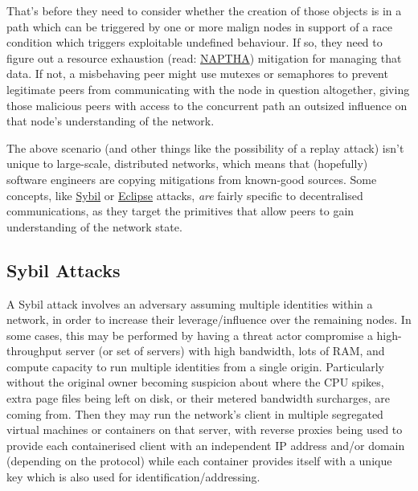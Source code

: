 That's before they need to consider whether the creation of those objects is in a path which can be triggered by one or more malign nodes in support of a race condition which triggers exploitable undefined behaviour. If so, they need to figure out a resource exhaustion (read: \href{https://www.giac.org/paper/gsec/313/naptha-type-denial-of-service-attack/100899}{NAPTHA}) mitigation for managing that data. If not, a misbehaving peer might use mutexes or semaphores to prevent legitimate peers from communicating with the node in question altogether, giving those malicious peers with access to the concurrent path an outsized influence on that node's understanding of the network.

The above scenario (and other things like the possibility of a replay attack) isn't unique to large-scale, distributed networks, which means that (hopefully) software engineers are copying mitigations from known-good sources.
         	Some concepts, like \href{https://www.sciencedirect.com/topics/computer-science/sybil-attack}{Sybil} or \href{https://www.nccgroup.com/research/how-to-spot-and-prevent-an-eclipse-attack/}{Eclipse} attacks, \emph{are} fairly specific to decentralised communications, as they target the primitives that allow peers to gain understanding of the network state.

\subsection{Sybil Attacks}

A Sybil attack involves an adversary assuming multiple identities within a network, in order to increase their leverage/influence over the remaining nodes.
         		In some cases, this may be performed by having a threat actor compromise a high-throughput server (or set of servers) with high bandwidth, lots of RAM, and compute capacity to run multiple identities from a single origin. Particularly without the original owner becoming suspicion about where the CPU spikes, extra page files being left on disk, or their metered bandwidth surcharges, are coming from. Then they may run
          		the network's client in multiple segregated virtual machines or containers on that server, with reverse proxies being used to provide each containerised client
            	with an independent IP address and/or domain (depending on the protocol) while each container provides itself with a unique key which is also used for identification/addressing.


